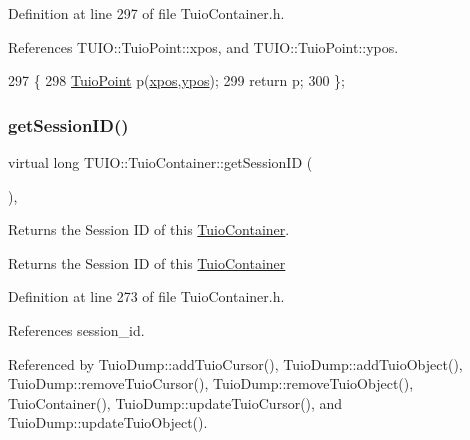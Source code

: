 Definition at line 297 of file Tuio\+Container.\+h.



References T\+U\+I\+O\+::\+Tuio\+Point\+::xpos, and T\+U\+I\+O\+::\+Tuio\+Point\+::ypos.


\begin{DoxyCode}
297                                         \{
298             \hyperlink{class_t_u_i_o_1_1_tuio_point_a8611528cf41b797c51d6a9bf324157a5}{TuioPoint} p(\hyperlink{class_t_u_i_o_1_1_tuio_point_a0021f8dfddd05f2a17e713a94f5457e6}{xpos},\hyperlink{class_t_u_i_o_1_1_tuio_point_a89a038775a681166168735dbc95c7779}{ypos});
299             \textcolor{keywordflow}{return} p;
300         \};
\end{DoxyCode}
\mbox{\label{class_t_u_i_o_1_1_tuio_container_a84c29bb63b233dbfd22811dab5b62833}} 
\subsubsection{\texorpdfstring{get\+Session\+I\+D()}{getSessionID()}}
{\footnotesize\ttfamily virtual long T\+U\+I\+O\+::\+Tuio\+Container\+::get\+Session\+ID (\begin{DoxyParamCaption}{ }\end{DoxyParamCaption})\hspace{0.3cm}{\ttfamily [inline]}, {\ttfamily [virtual]}}

Returns the Session ID of this \hyperlink{class_t_u_i_o_1_1_tuio_container}{Tuio\+Container}. \begin{DoxyReturn}{Returns}
the Session ID of this \hyperlink{class_t_u_i_o_1_1_tuio_container}{Tuio\+Container} 
\end{DoxyReturn}


Definition at line 273 of file Tuio\+Container.\+h.



References session\+\_\+id.



Referenced by Tuio\+Dump\+::add\+Tuio\+Cursor(), Tuio\+Dump\+::add\+Tuio\+Object(), Tuio\+Dump\+::remove\+Tuio\+Cursor(), Tuio\+Dump\+::remove\+Tuio\+Object(), Tuio\+Container(), Tuio\+Dump\+::update\+Tuio\+Cursor(), and Tuio\+Dump\+::update\+Tuio\+Object().


